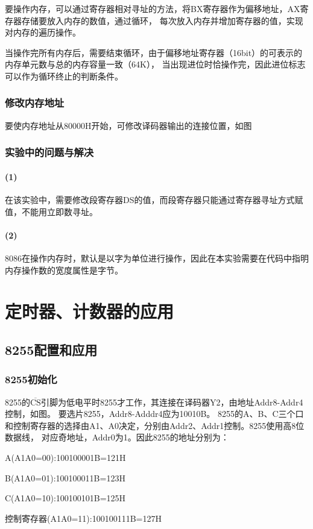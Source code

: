 \documentclass[12pt, a4paper, oneside]{ctexart}
\begin{document}
    要操作内存，可以通过寄存器相对寻址的方法，将BX寄存器作为偏移地址，AX寄存器存储要放入内存的数值，通过循环，
    每次放入内存并增加寄存器的值，实现对内存的遍历操作。

    当操作完所有内存后，需要结束循环，由于偏移地址寄存器（16bit）的可表示的内存单元数与总的内存容量一致（64K），
    当出现进位时恰操作完，因此进位标志可以作为循环终止的判断条件。
    \subsubsection{修改内存地址}
    要使内存地址从80000H开始，可修改译码器输出的连接位置，如图
    \subsubsection{实验中的问题与解决}
    \paragraph{(1)} 在该实验中，需要修改段寄存器DS的值，而段寄存器只能通过寄存器寻址方式赋值，不能用立即数寻址。
    \paragraph{(2)} 8086在操作内存时，默认是以字为单位进行操作，因此在本实验需要在代码中指明内存操作数的宽度属性是字节。
    \section{定时器、计数器的应用}
    \subsection{8255配置和应用}
    \subsubsection{8255初始化}
    8255的$\overline{\text{CS}}$引脚为低电平时8255才工作，其连接在译码器Y2，由地址Addr8-Addr4控制，如图。
    要选片8255，Addr8-Adddr4应为10010B。
    8255的A、B、C三个口和控制寄存器的选择由A1、A0决定，分别由Addr2、Addr1控制。8255使用高8位数据线，
    对应奇地址，Addr0为1。因此8255的地址分别为：

    
    A(A1A0=00):100100001B=121H

    B(A1A0=01):100100011B=123H

    C(A1A0=10):100100101B=125H

    控制寄存器(A1A0=11):100100111B=127H
\end{document}
